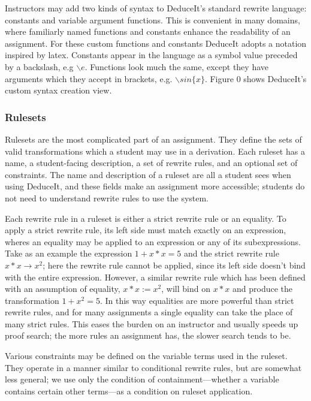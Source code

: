 \documentclass{sigchi}
\begin{document}
Instructors may add two kinds of syntax to DeduceIt's standard rewrite language: constants and variable argument functions. This is convenient in many domains, where familiarly named functions and constants enhance the readability of an assignment. For these custom functions and constants DeduceIt adopts a notation inspired by latex. Constants appear in the language as a symbol value preceded by a backslash, e.g $\backslash{}e$. Functions look much the same, except they have arguments which they accept in brackets, e.g. $\backslash{}sin\{x\}$. Figure 0 shows DeduceIt's custom syntax creation view.


\subsubsection{Rulesets}

Rulesets are the most complicated part of an assignment. They define the sets of valid transformations which a student may use in a derivation. Each ruleset has a name, a student-facing description, a set of rewrite rules, and an optional set of constraints. The name and description of a ruleset are all a student sees when using DeduceIt, and these fields  make an assignment more accessible; students do not need to understand rewrite rules to use the system.

Each rewrite rule in a ruleset is either a strict rewrite rule or an equality. To apply a strict rewrite rule, its left side must match exactly on an expression, wheres an equality may be applied to an expression or any of its subexpressions. Take as an example the expression $1+x*x=5$ and the strict rewrite rule $x*x \rightarrow x^2$; here the rewrite rule cannot be applied, since its left side doesn't bind with the entire expression. However, a similar rewrite rule which has been defined with an assumption of equality, $x*x := x^2$, will bind on $x*x$ and produce the transformation $1+x^2=5$. In this way equalities are more powerful than strict rewrite rules, and for many assignments a single equality can take the place of many strict rules. This eases the burden on an instructor and usually speeds up proof search; the more rules an assignment has, the slower search tends to be.

Various constraints may be defined on the variable terms used in the ruleset. They operate in a manner similar to conditional rewrite rules, but are somewhat less general; we use only the condition of containment---whether a variable contains certain other terms---as a condition on ruleset application.
\end{document}
